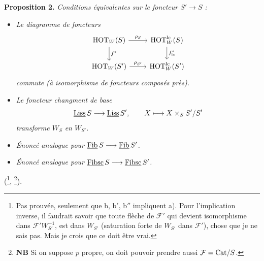\textbf{Proposition 2.} \textit{Conditions équivalentes sur le foncteur $S' \longrightarrow S$ :}

\begin{itemize}
\item[\textit{a)}] \textit{Le diagramme de foncteurs}
\[
\begin{tikzcd}
\HOT_W(S) \arrow[r, "\rho_S"] \arrow[d, "f^*"] & \HOT_W^{\mathrm{lc}}(S) \arrow[d, "f^*_{\mathrm{lc}}"] \\
\HOT_W(S') \arrow[r, "\rho_{S'}"] & \HOT_W^{\mathrm{lc}}(S')
\end{tikzcd}
\]
\textit{commute (à isomorphisme de foncteurs composés près).}


\item[\textit{b)}] \textit{Le foncteur changment de base} %
\[
\underline{\mathrm{Liss}}\,S \longrightarrow \underline{\mathrm{Liss}}\,S', \qquad X \longmapsto X \times_S S'/S'
\]
\textit{transforme $W_S$ en $W_{S'}$.}
\item[\textit{b$'$)}] \textit{Énoncé analogue pour} $\underline{\mathrm{Fib}}\,S \longrightarrow \underline{\mathrm{Fib}}\,S'$\textit{.}
\item[\textit{b$''$)}] \textit{Énoncé analogue pour} $\underline{\mathrm{Fibsc}}\,S \longrightarrow \underline{\mathrm{Fibsc}}\,S'$\textit{.}
\end{itemize}

(\footnote[63]{Pas prouvée, seulement que b, b$'$, b$''$ impliquent a). Pour l'implication inverse, il faudrait savoir que toute flèche de $\mathcal{F}'$ qui devient isomorphisme dans $\mathcal{F}'W_{S'}^{-1}$, est dans $W_{S'}$ (saturation forte de $W_{S'}$ dans $\mathcal{F}'$), chose que je ne sais pas. Mais je crois que ce doit être vrai.}, \footnote[64]{\textbf{NB} Si on suppose $p$ propre, on doit pouvoir prendre aussi $\mathcal{F} = \mathrm{Cat}/S$.}).

